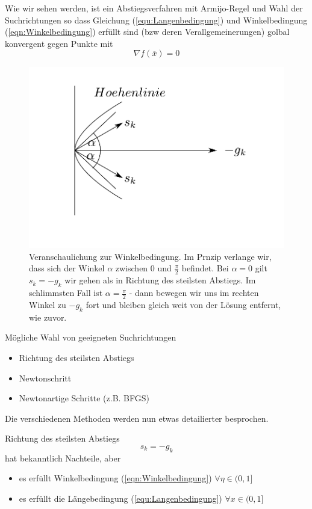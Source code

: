 \documentclass[10pt,a4paper]{article}
\begin{document}
Wie wir sehen werden, ist ein Abstiegsverfahren mit Armijo-Regel und Wahl der Suchrichtungen so dass Gleichung (\ref{equ:Langenbedingung}) und Winkelbedingung (\ref{eqn:Winkelbedingung}) erfüllt sind (bzw deren Verallgemeinerungen) golbal konvergent gegen Punkte mit $$\nabla f(\overline{x})=0$$

\begin{figure}[H]
\includegraphics[width=\textwidth]{images/winkelbedingung}
\caption{Veranschaulichung zur Winkelbedingung. Im Prnzip verlange wir, dass sich der Winkel $\alpha$ zwischen 0 und $\frac{\pi}{2}$ befindet. Bei $\alpha=0$ gilt $s_k=-g_k$ wir gehen als in Richtung des steilsten Abstiegs. Im schlimmsten Fall ist $\alpha=\frac{\pi}{2}$ - dann bewegen wir uns im rechten Winkel zu $-g_k$ fort und bleiben gleich weit von der Lösung entfernt, wie zuvor.}
\end{figure}


Mögliche Wahl von geeigneten Suchrichtungen

\begin{itemize}
\item Richtung des steilsten Abstiegs
\item Newtonschritt
\item Newtonartige Schritte (z.B. BFGS)
\end{itemize}

Die verschiedenen Methoden werden nun etwas detailierter besprochen.

Richtung des steilsten Abstiegs  $$s_k = -g_k$$ hat bekanntlich Nachteile, aber

\begin{itemize}
\item es erfüllt Winkelbedingung (\ref{eqn:Winkelbedingung}) $\forall \eta \in (0,1]$
\item es erfüllt die Längebedingung (\ref{equ:Langenbedingung}) $\forall x \in (0,1]$
\end{itemize}
\end{document}
